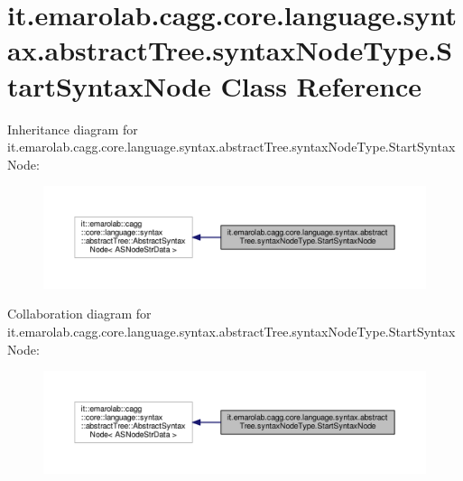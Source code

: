 \hypertarget{classit_1_1emarolab_1_1cagg_1_1core_1_1language_1_1syntax_1_1abstractTree_1_1syntaxNodeType_1_1StartSyntaxNode}{\section{it.\-emarolab.\-cagg.\-core.\-language.\-syntax.\-abstract\-Tree.\-syntax\-Node\-Type.\-Start\-Syntax\-Node Class Reference}
\label{classit_1_1emarolab_1_1cagg_1_1core_1_1language_1_1syntax_1_1abstractTree_1_1syntaxNodeType_1_1StartSyntaxNode}
}


Inheritance diagram for it.\-emarolab.\-cagg.\-core.\-language.\-syntax.\-abstract\-Tree.\-syntax\-Node\-Type.\-Start\-Syntax\-Node\-:\nopagebreak
\begin{figure}[H]
\begin{center}
\leavevmode
\includegraphics[width=350pt]{classit_1_1emarolab_1_1cagg_1_1core_1_1language_1_1syntax_1_1abstractTree_1_1syntaxNodeType_1_1StartSyntaxNode__inherit__graph}
\end{center}
\end{figure}


Collaboration diagram for it.\-emarolab.\-cagg.\-core.\-language.\-syntax.\-abstract\-Tree.\-syntax\-Node\-Type.\-Start\-Syntax\-Node\-:\nopagebreak
\begin{figure}[H]
\begin{center}
\leavevmode
\includegraphics[width=350pt]{classit_1_1emarolab_1_1cagg_1_1core_1_1language_1_1syntax_1_1abstractTree_1_1syntaxNodeType_1_1StartSyntaxNode__coll__graph}
\end{center}
\end{figure}
